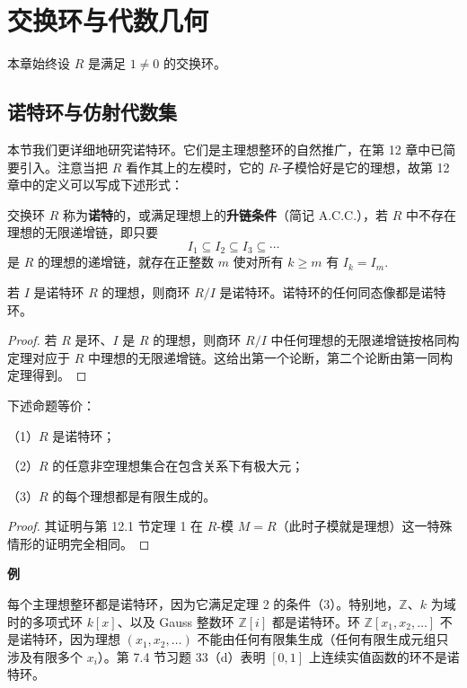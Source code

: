 
\setcounter{chapter}{14}

\chapter{交换环与代数几何}

本章始终设 \(R\) 是满足 \(1 \neq 0\) 的交换环。

\section{诺特环与仿射代数集}

本节我们更详细地研究诺特环。它们是主理想整环的自然推广，在第 12 章中已简要引入。注意当把 \(R\) 看作其上的左模时，它的 \(R\)-子模恰好是它的理想，故第 12 章中的定义可以写成下述形式：

\begin{definition}
交换环 \(R\) 称为\textbf{诺特}的，或满足理想上的\textbf{升链条件}（简记 A.C.C.），若 \(R\) 中不存在理想的无限递增链，即只要
\[
I_1 \subseteq I_2 \subseteq I_3 \subseteq \cdots
\]
是 \(R\) 的理想的递增链，就存在正整数 \(m\) 使对所有 \(k \geq m\) 有 \(I_k = I_m\).
\end{definition}

\begin{proposition}\label{pro:15.1}
若 \(I\) 是诺特环 \(R\) 的理想，则商环 \(R/I\) 是诺特环。诺特环的任何同态像都是诺特环。
\end{proposition}

\begin{proof}
若 \(R\) 是环、\(I\) 是 \(R\) 的理想，则商环 \(R/I\) 中任何理想的无限递增链按格同构定理对应于 \(R\) 中理想的无限递增链。这给出第一个论断，第二个论断由第一同构定理得到。
\end{proof}

\begin{theorem}\label{thm:15.2}
下述命题等价：

（1）\(R\) 是诺特环；

（2）\(R\) 的任意非空理想集合在包含关系下有极大元；

（3）\(R\) 的每个理想都是有限生成的。
\end{theorem}

\begin{proof}
其证明与第 12.1 节定理 1 在 \(R\)-模 \(M = R\)（此时子模就是理想）这一特殊情形的证明完全相同。
\end{proof}

\noindent\textbf{例}

每个主理想整环都是诺特环，因为它满足定理 2 的条件（3）。特别地，\(\mathbb{Z}\)、\(k\) 为域时的多项式环 \(k[x]\)、以及 Gauss 整数环 \(\mathbb{Z}[i]\) 都是诺特环。环 \(\mathbb{Z}[x_1, x_2, \ldots]\) 不是诺特环，因为理想 \((x_1, x_2, \ldots)\) 不能由任何有限集生成（任何有限生成元组只涉及有限多个 \(x_i\)）。第 7.4 节习题 33（d）表明 \([0,1]\) 上连续实值函数的环不是诺特环。

